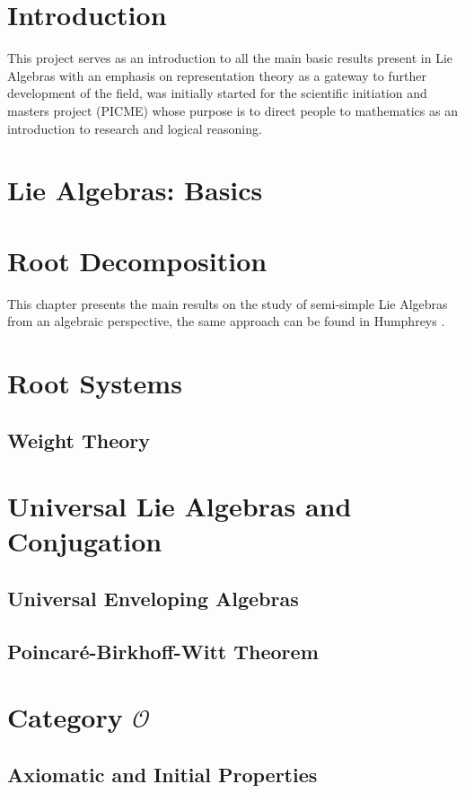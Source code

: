\documentclass[svgnames,12pt,oneside, openright,a4paper]{scrbook}
\newcommand{\bggO}{\mathcal{O}}
\begin{document}

 \tableofcontents
\chapter*{Introduction}
This project serves as an introduction to all the main basic results present in Lie Algebras with an emphasis on representation theory as a gateway to further development of the field, was initially started for the scientific initiation and masters project (PICME) whose purpose is to direct people to mathematics as an introduction to research and logical reasoning.
\chapter{Lie Algebras: Basics}






\chapter{Root Decomposition}
This chapter presents the main results on the study of semi-simple Lie Algebras from an algebraic perspective, the same approach can be found in Humphreys \cite{humphreys1}.




\chapter{Root Systems}


\section{Weight Theory}
\chapter{Universal Lie Algebras and Conjugation}

\section{Universal Enveloping Algebras}
\section{Poincaré-Birkhoff-Witt Theorem}
\chapter{Category $\bggO$}
\section{Axiomatic and Initial Properties}
\end{document}
